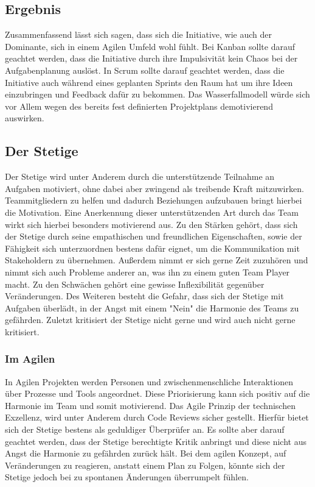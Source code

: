 \documentclass[twocolumn,10pt]{asme2ej}
\begin{document}
\subsection{Ergebnis}
Zusammenfassend lässt sich sagen, dass sich die Initiative, wie auch der Dominante, sich in einem Agilen Umfeld wohl fühlt. Bei Kanban sollte darauf geachtet werden, dass die Initiative durch ihre Impulsivität kein Chaos bei der Aufgabenplanung auslöst. In Scrum sollte darauf geachtet werden, dass die Initiative auch während eines geplanten Sprints den Raum hat um ihre Ideen einzubringen und Feedback dafür zu bekommen. Das Wasserfallmodell würde sich vor Allem wegen des bereits fest definierten Projektplans demotivierend auswirken.

\subsection{Der Stetige}
Der Stetige wird unter Anderem durch die unterstützende Teilnahme an Aufgaben motiviert, ohne dabei aber zwingend als treibende Kraft mitzuwirken. Teammitgliedern zu helfen und dadurch Beziehungen aufzubauen bringt hierbei die Motivation. Eine Anerkennung dieser unterstützenden Art durch das Team wirkt sich hierbei besonders motivierend aus. Zu den Stärken gehört, dass sich der Stetige durch seine empathischen und freundlichen Eigenschaften, sowie der Fähigkeit sich unterzuordnen bestens dafür eignet, um die Kommunikation mit Stakeholdern zu übernehmen. Außerdem nimmt er sich gerne Zeit zuzuhören und nimmt sich auch Probleme anderer an, was ihn zu einem guten Team Player macht. Zu den Schwächen gehört eine gewisse Inflexibilität gegenüber Veränderungen. Des Weiteren besteht die Gefahr, dass sich der Stetige mit Aufgaben überlädt, in der Angst mit einem "Nein" die Harmonie des Teams zu gefährden. Zuletzt kritisiert der Stetige nicht gerne und wird auch nicht gerne kritisiert.

\subsubsection{Im Agilen}
In Agilen Projekten werden Personen und zwischenmenschliche Interaktionen über Prozesse und Tools angeordnet. Diese Priorisierung kann sich positiv auf die Harmonie im Team und somit motivierend. Das Agile Prinzip der technischen Exzellenz, wird unter Anderem durch Code Reviews sicher gestellt. Hierfür bietet sich der Stetige bestens als geduldiger Überprüfer an. Es sollte aber darauf geachtet werden, dass der Stetige berechtigte Kritik anbringt und diese nicht aus Angst die Harmonie zu gefährden zurück hält. Bei dem agilen Konzept, auf Veränderungen zu reagieren, anstatt einem Plan zu Folgen, könnte sich der Stetige jedoch bei zu spontanen Änderungen überrumpelt fühlen.
\end{document}
